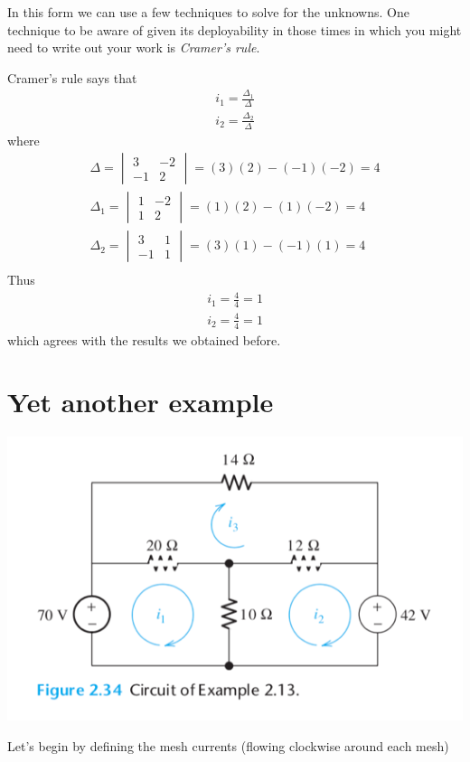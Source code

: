 \documentclass[11pt]{book}
\begin{document}
In this form we can use a few techniques to solve for the unknowns. One technique to be aware of given its deployability in those times in which you might need to write out your work is \textit{Cramer's rule}.

Cramer's rule says that 
\begin{eqnarray}
	i_1 = \frac{\Delta_1}{\Delta} \\
	i_2 = \frac{\Delta_2}{\Delta}
\end{eqnarray}
where
\begin{eqnarray}
	\Delta = 
	\begin{vmatrix}
		3 & -2 \\ -1 & 2
	\end{vmatrix}
	= (3)(2) - (-1)(-2) = 4 \\
	\Delta_1 = 
	\begin{vmatrix}
		1 & -2 \\ 1 & 2
	\end{vmatrix}
	= (1)(2) - (1)(-2) = 4 \\
	\Delta_2 = 
	\begin{vmatrix}
		3 & 1 \\ -1 & 1
	\end{vmatrix}
	= (3)(1) - (-1)(1) = 4 \\
\end{eqnarray}
Thus
\begin{eqnarray}
	i_1 = \frac{4}{4} = 1 \\
	i_2 = \frac{4}{4} = 1
\end{eqnarray}
which agrees with the results we obtained before.



\section{Yet another example}
\begin{center}
	\includegraphics{figures/05.mesh5.png}
\end{center}
Let's begin by defining the mesh currents (flowing clockwise around each mesh)
\end{document}
